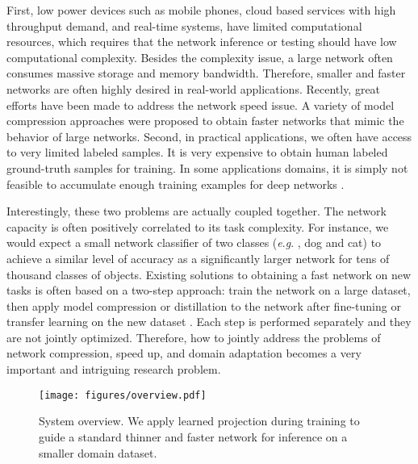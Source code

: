 \documentclass[journal]{IEEEtran}
\newcommand{\eg}{\textit{e}.\textit{g}. }
\begin{document}
First, low power devices such as mobile phones, cloud based services with high throughput demand, and real-time systems, 
have limited computational resources, which requires that the network inference or testing should have low computational complexity. 
Besides the complexity issue, a large network often consumes massive storage and memory bandwidth. Therefore, smaller and faster networks are often highly desired  in real-world applications.
Recently, great efforts have been made to address the network speed issue. A variety of model compression approaches \cite{NIPS1989_250,hassibi1993second,han2015deep,jaderberg2014speeding,hinton2015distilling} were proposed to obtain faster networks that mimic the behavior of large networks. 
Second, in practical applications,  we often have access to very limited labeled samples. It is very expensive to obtain human labeled ground-truth samples for training. In some applications domains, 
it is simply not feasible to accumulate enough training examples for deep networks  \cite{pan2011domain,zhang2013domain,wang2014flexible,tzeng2015simultaneous} 
.

Interestingly, these two problems are actually coupled together. The network capacity is often positively correlated to its task complexity. For instance, we would expect a small network classifier of two classes (\eg, dog and cat) to achieve a similar  level of accuracy as a significantly larger network for tens of thousand classes of objects. Existing solutions to obtaining a fast network on new tasks is often based on a two-step approach: train the network on a large dataset, then apply model compression or distillation to the network after fine-tuning or transfer learning on the new dataset \cite{hinton2015distilling}. 
Each step is performed separately and they are not jointly optimized.
Therefore, how to jointly address the problems of network compression, speed up, and domain adaptation becomes a very important and intriguing research problem. 

\begin{figure}[h]
\begin{center}
   \texttt{[image: figures/overview.pdf]}
\end{center}
\caption{System overview. We apply learned projection during training to guide a standard thinner and faster network for inference on a smaller domain dataset.}
\label{fig:overview}
\end{figure}
\end{document}
